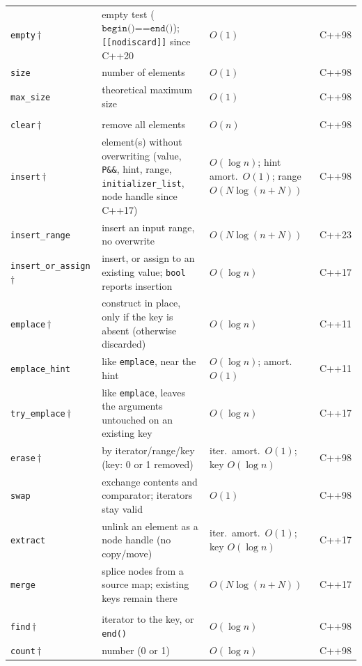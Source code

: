 \begin{longtable}{@{}>{\raggedright\arraybackslash}p{3.1cm} >{\raggedright\arraybackslash}p{5.7cm} >{\raggedright\arraybackslash}p{2.7cm} >{\raggedright\arraybackslash}p{1.1cm}@{}}
  \addlinespace[2pt]
  \texttt{empty}\,$\dagger$ & empty test ($\texttt{begin()==end()}$); \texttt{[[nodiscard]]} since C++20 & $O(1)$ & C++98 \\
  \texttt{size} & number of elements & $O(1)$ & C++98 \\
  \texttt{max\_size} & theoretical maximum size & $O(1)$ & C++98 \\
  \addlinespace[3pt]
  \multicolumn{4}{@{}l}{\textbf{Modifiers}}\\
  \addlinespace[2pt]
  \texttt{clear}\,$\dagger$ & remove all elements & $O(n)$ & C++98 \\
  \texttt{insert}\,$\dagger$ & element(s) without overwriting (value, \texttt{P\&\&}, hint, range, \texttt{initializer\_list}, node handle since C++17) & $O(\log n)$; hint amort.\ $O(1)$; range $O(N\log(n{+}N))$ & C++98 \\
  \texttt{insert\_range} & insert an input range, no overwrite & $O(N\log(n{+}N))$ & C++23 \\
  \texttt{insert\_\allowbreak{}or\_\allowbreak{}assign}\,$\dagger$ & insert, or assign to an existing value; \texttt{bool} reports insertion & $O(\log n)$ & C++17 \\
  \texttt{emplace}\,$\dagger$ & construct in place, only if the key is absent (otherwise discarded) & $O(\log n)$ & C++11 \\
  \texttt{emplace\_hint} & like \texttt{emplace}, near the hint & $O(\log n)$; amort.\ $O(1)$ & C++11 \\
  \texttt{try\_emplace}\,$\dagger$ & like \texttt{emplace}, leaves the arguments untouched on an existing key & $O(\log n)$ & C++17 \\
  \texttt{erase}\,$\dagger$ & by iterator/range/key (key: 0 or 1 removed) & iter.\ amort.\ $O(1)$; key $O(\log n)$ & C++98 \\
  \texttt{swap} & exchange contents and comparator; iterators stay valid & $O(1)$ & C++98 \\
  \texttt{extract} & unlink an element as a node handle (no copy/move) & iter.\ amort.\ $O(1)$; key $O(\log n)$ & C++17 \\
  \texttt{merge} & splice nodes from a source map; existing keys remain there & $O(N\log(n{+}N))$ & C++17 \\
  \addlinespace[3pt]
  \multicolumn{4}{@{}l}{\textbf{Lookup}}\\
  \addlinespace[2pt]
  \texttt{find}\,$\dagger$ & iterator to the key, or \texttt{end()} & $O(\log n)$ & C++98 \\
  \texttt{count}\,$\dagger$ & number (0 or 1) & $O(\log n)$ & C++98 \\

\end{longtable}
